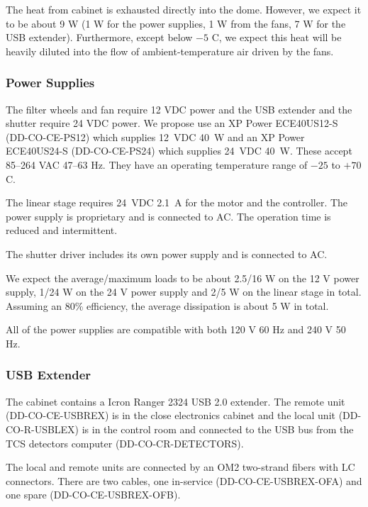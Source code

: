 \documentclass{article}
\begin{document}
The heat from cabinet is exhausted directly into the dome. However, we expect it to be about 9 W (1 W for the power supplies, 1 W from the fans, 7 W for the USB extender). Furthermore, except below $-5$ C, we expect this heat will be heavily diluted into the flow of ambient-temperature air driven by the fans.

\subsubsection{Power Supplies}

The filter wheels and fan require 12 VDC power and the USB extender and the shutter require 24 VDC power. We propose use an XP Power ECE40US12-S (DD-CO-CE-PS12) which supplies 12~VDC 40~W and an XP Power ECE40US24-S (DD-CO-CE-PS24) which supplies 24~VDC 40~W. These accept 85--264 VAC 47--63 Hz. They have an operating temperature range of $-25$ to $+70$ C.

The linear stage requires 24~VDC 2.1~A for the motor and the controller. The power supply is proprietary and is connected to AC. The operation time is reduced and intermittent.

The shutter driver includes its own power supply and is connected to AC.

We expect the average/maximum loads to be about 2.5/16 W on the 12 V power supply, 1/24 W on the 24 V power supply and 2/5 W on the linear stage in total. Assuming an 80\% efficiency, the average dissipation is about 5 W in total.

All of the power supplies are compatible with both 120 V 60 Hz and 240 V 50 Hz.

\subsubsection{USB Extender}

The cabinet contains a Icron Ranger 2324 USB 2.0 extender. The remote unit (DD-CO-CE-USBREX) is in the close electronics cabinet and the local unit (DD-CO-R-USBLEX) is in the control room and connected to the USB bus from the TCS detectors computer (DD-CO-CR-DETECTORS). 

The local and remote units are connected by an OM2 two-strand fibers with LC connectors. There are two cables, one in-service (DD-CO-CE-USBREX-OFA) and one spare (DD-CO-CE-USBREX-OFB).

\end{document}
